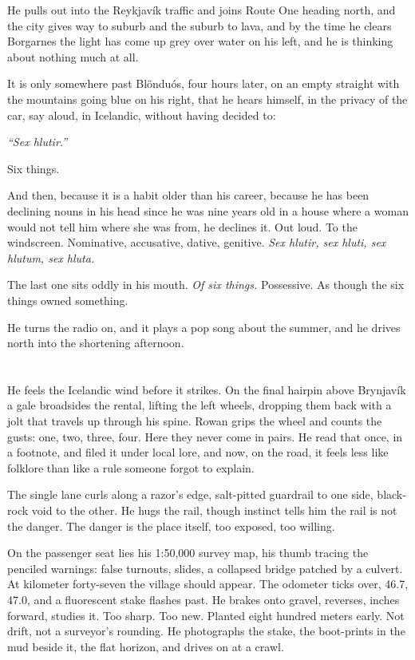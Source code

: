 \documentclass[11pt,oneside]{book}
\begin{document}
He pulls out into the Reykjavík traffic and joins Route One heading
north, and the city gives way to suburb and the suburb to lava, and by
the time he clears Borgarnes the light has come up grey over water on
his left, and he is thinking about nothing much at all.

It is only somewhere past Blönduós, four hours later, on an empty
straight with the mountains going blue on his right, that he hears
himself, in the privacy of the car, say aloud, in Icelandic, without
having decided to:

\emph{``Sex hlutir.''}

Six things.

And then, because it is a habit older than his career, because he has
been declining nouns in his head since he was nine years old in a house
where a woman would not tell him where she was from, he declines it. Out
loud. To the windscreen. Nominative, accusative, dative, genitive.
\emph{Sex hlutir, sex hluti, sex hlutum, sex hluta.}

The last one sits oddly in his mouth. \emph{Of six things.} Possessive.
As though the six things owned something.

He turns the radio on, and it plays a pop song about the summer, and he
drives north into the shortening afternoon.

\chapter{}

He feels the Icelandic wind before it strikes. On the final hairpin
above Brynjavík a gale broadsides the rental, lifting the left wheels,
dropping them back with a jolt that travels up through his spine. Rowan
grips the wheel and counts the gusts: one, two, three, four. Here they
never come in pairs. He read that once, in a footnote, and filed it
under local lore, and now, on the road, it feels less like folklore than
like a rule someone forgot to explain.

The single lane curls along a razor's edge, salt-pitted guardrail to one
side, black-rock void to the other. He hugs the rail, though instinct
tells him the rail is not the danger. The danger is the place itself,
too exposed, too willing.

On the passenger seat lies his 1:50,000 survey map, his thumb tracing
the penciled warnings: false turnouts, slides, a collapsed bridge
patched by a culvert. At kilometer forty-seven the village should
appear. The odometer ticks over, 46.7, 47.0, and a fluorescent stake
flashes past. He brakes onto gravel, reverses, inches forward, studies
it. Too sharp. Too new. Planted eight hundred meters early. Not drift,
not a surveyor's rounding. He photographs the stake, the boot-prints in
the mud beside it, the flat horizon, and drives on at a crawl.
\end{document}
